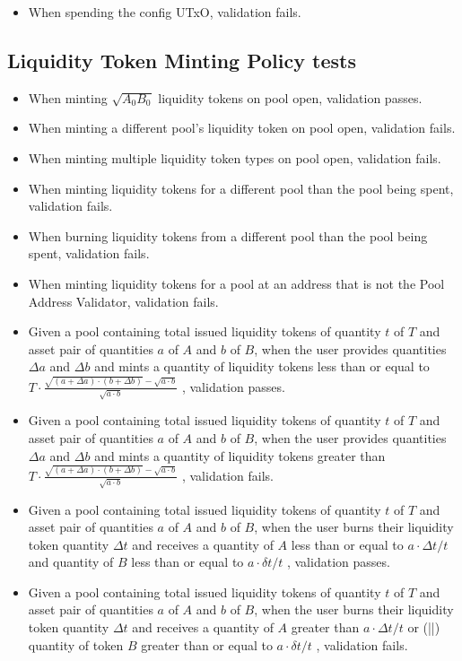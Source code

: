 \documentclass{article}
\begin{document}
\begin{itemize}
	\item When spending the config UTxO, validation fails.
\end{itemize}

\subsection{Liquidity Token Minting Policy tests}

\begin{itemize}
	\item When minting $\sqrt{A_0B_0}$ liquidity tokens on pool open, validation passes.
	\item When minting a different pool's liquidity token on pool open, validation fails.
	\item When minting multiple liquidity token types on pool open, validation fails.
	\item When minting liquidity tokens for a different pool than the pool being spent, validation fails.
	\item When burning liquidity tokens from a different pool than the pool being spent, validation fails.
	\item When minting liquidity tokens for a pool at an address that is not the Pool Address Validator, validation fails.
	\item Given a pool containing total issued liquidity tokens of quantity $t$ of $T$ and asset
	      pair of quantities $a$ of $A$ and $b$ of $B$, when the user provides quantities $\Delta a$ and $\Delta b$
  	      and mints a quantity of liquidity tokens less than or equal to
	      $T \cdot \frac{\sqrt{ (a + \Delta a) \cdot (b + \Delta b)} - \sqrt{a \cdot b}}{\sqrt{a \cdot b}}$
	      , validation passes.
	\item Given a pool containing total issued liquidity tokens of quantity $t$ of $T$ and asset
	      pair of quantities $a$ of $A$ and $b$ of $B$, when the user provides quantities $\Delta a$ and $\Delta b$
	      and mints a quantity of liquidity tokens greater than
              $T \cdot \frac{\sqrt{ (a + \Delta a) \cdot (b + \Delta b)} - \sqrt{a \cdot b}}{\sqrt{a \cdot b}}$
	      , validation fails.
	\item Given a pool containing total issued liquidity tokens of quantity $t$ of $T$ and asset pair of quantities
	      $a$ of $A$ and $b$ of $B$, when the user burns
	      their liquidity token quantity $\Delta t$ and receives a quantity of $A$ less than or equal to
	      $ a \cdot \Delta t/t $ and quantity of $B$ less than or equal to $ a \cdot \delta t/t $
	      , validation passes.
	\item Given a pool containing total issued liquidity tokens of quantity $t$ of $T$ and asset
	      pair of quantities $a$ of $A$ and $b$ of $B$, when the user burns
	      their liquidity token quantity $\Delta t$ and receives a quantity of $A$ greater than
	      $ a \cdot \Delta t/t $ or (||) quantity of token $B$ greater than or equal to $ a \cdot \delta t/t $
	      , validation fails.
\end{itemize}
\end{document}
